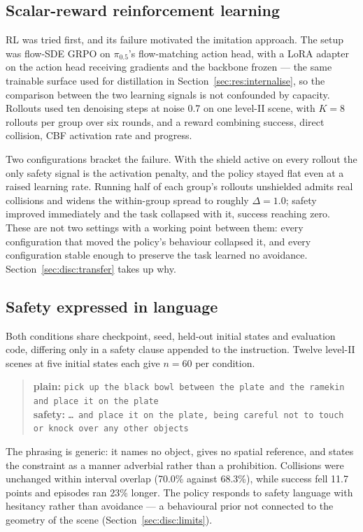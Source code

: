 \documentclass[a4paper,11pt]{report}
\begin{document}
\subsection*{Scalar-reward reinforcement learning}

RL was tried first, and its failure motivated the imitation approach. The setup was flow-SDE GRPO
on $\pi_{0.5}$'s flow-matching action head, with a LoRA adapter on the action head receiving
gradients and the backbone frozen --- the same trainable surface used for distillation in
Section~\ref{sec:res:internalise}, so the comparison between the two learning signals is not
confounded by capacity. Rollouts used ten denoising steps at noise 0.7 on one level-II scene, with
$K = 8$ rollouts per group over six rounds, and a reward combining success, direct collision, CBF
activation rate and progress.

Two configurations bracket the failure. With the shield active on every rollout the only safety
signal is the activation penalty, and the policy stayed flat even at a raised learning rate.
Running half of each group's rollouts unshielded admits real collisions and widens the within-group
spread to roughly $\Delta = 1.0$; safety improved immediately and the task collapsed with it,
success reaching zero. These are not two settings with a working point between them: every
configuration that moved the policy's behaviour collapsed it, and every configuration stable enough
to preserve the task learned no avoidance. Section~\ref{sec:disc:transfer} takes up why.

\subsection*{Safety expressed in language}

Both conditions share checkpoint, seed, held-out initial states and evaluation code, differing only
in a safety clause appended to the instruction. Twelve level-II scenes at five initial states each
give $n = 60$ per condition.

\begin{quote}\small
\textbf{plain:} \texttt{pick up the black bowl between the plate and the ramekin and place it on
the plate}\\[3pt]
\textbf{safety:} \texttt{\dots{} and place it on the plate, being careful not to touch or knock
over any other objects}
\end{quote}

The phrasing is generic: it names no object, gives no spatial reference, and states the constraint
as a manner adverbial rather than a prohibition. Collisions were unchanged within interval overlap
(70.0\% against 68.3\%), while success fell 11.7 points and episodes ran 23\% longer. The policy
responds to safety language with hesitancy rather than avoidance --- a behavioural prior not
connected to the geometry of the scene (Section~\ref{sec:disc:limits}).
\end{document}

